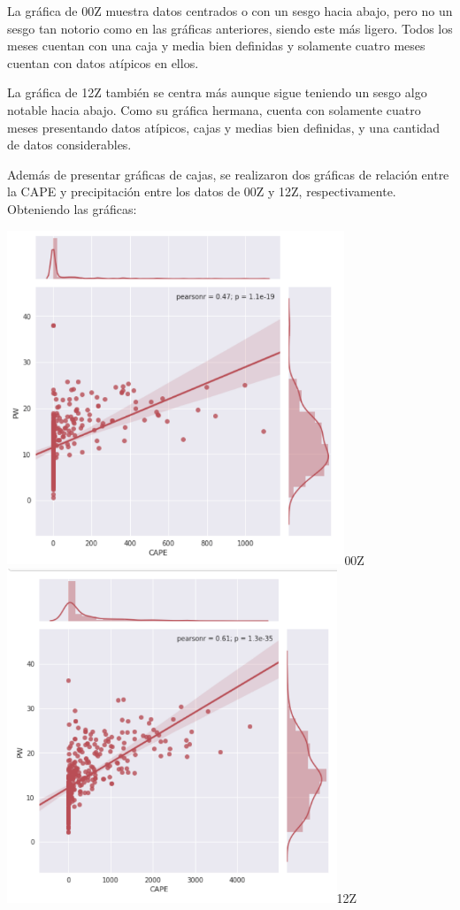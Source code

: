 \documentclass{article}
\begin{document}
La gráfica de 00Z muestra datos centrados o con un sesgo hacia abajo, pero no un sesgo tan notorio como en las gráficas anteriores, siendo este más ligero. Todos los meses cuentan con una caja y media bien definidas y solamente cuatro meses cuentan con datos atípicos en ellos.

La gráfica de 12Z también se centra más aunque sigue teniendo un sesgo algo notable hacia abajo. Como su gráfica hermana, cuenta con solamente cuatro meses presentando datos atípicos, cajas y medias bien definidas, y una cantidad de datos considerables.

Además de presentar gráficas de cajas, se realizaron dos gráficas de relación entre la CAPE y precipitación entre los datos de 00Z y 12Z, respectivamente. Obteniendo las gráficas:

	\begin{center}
    \includegraphics[height=10cm]{relacion00.png}{00Z}
    \includegraphics[height=10cm]{relacion12.png}{12Z}
    \end{center}
    
\end{document}
